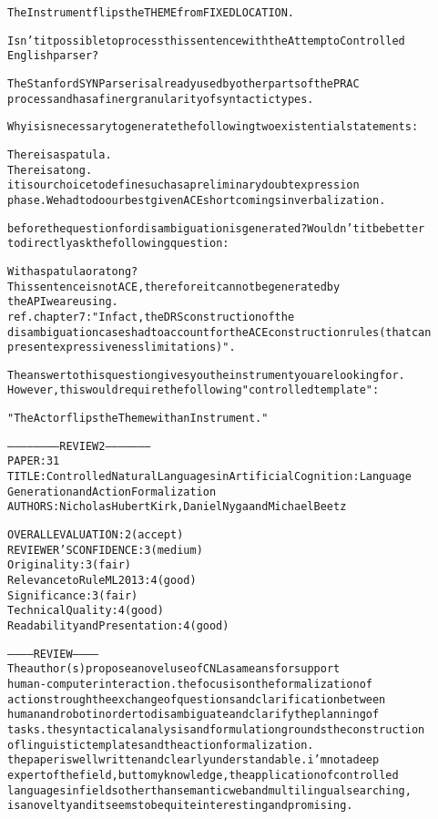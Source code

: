 \documentclass[oribibl]{llncs}
\newcommand{\comment}[1]{{\color{red} #1}}
\begin{document}
\begin{alltt}
   The Instrument flips the THEME from FIXEDLOCATION.

Isn't it possible to process this sentence with the Attempto Controlled 
English parser?

\comment{The Stanford SYN Parser is already used by other parts of the PRAC
 process and has a finer granularity of syntactic types.}

Why is is necessary to generate the following two existential statements:

   There is a spatula.
   There is a tong.
\comment{it is our choice to define such as a preliminary doubt expression
 phase. We had to do our best given ACE shortcomings in verbalization.}

before the question for disambiguation is generated? Wouldn't it be better
 to directly ask the following question:

   With a spatula or a tong?
\comment{This sentence is not ACE, therefore it cannot be generated by
 the API we are using.}
\comment{ref. chapter 7: "In fact, the DRS construction of the
disambiguation cases had to account for the ACE construction rules (that can
present expressiveness limitations)".}

The answer to this question gives you the instrument you are looking for. 
However, this would require the following "controlled template":

   "The Actor flips the Theme with an Instrument."


----------------------- REVIEW 2 ---------------------
PAPER: 31
TITLE: Controlled Natural Languages in Artificial Cognition: Language 
Generation and Action Formalization
AUTHORS: Nicholas Hubert Kirk, Daniel Nyga and Michael Beetz

OVERALL EVALUATION: 2 (accept)
REVIEWER'S CONFIDENCE: 3 (medium)
Originality: 3 (fair)
Relevance to RuleML 2013: 4 (good)
Significance: 3 (fair)
Technical Quality: 4 (good)
Readability and Presentation: 4 (good)

----------- REVIEW -----------
The author(s) propose a novel use of CNL as a means for support 
human-computer interaction. the focus is on the formalization of 
actions trough the exchange of questions and clarification between 
human and robot in order to disambiguate and clarify the planning of 
tasks. the syntactical analysis and formulation grounds the construction
 of linguistic templates and the action formalization.
the paper is well written and clearly understandable. i'm not a deep 
expert of the field, but to my knowledge, the  application  of controlled 
languages in fields other than semantic web and multilingual searching, 
is a novelty and it seems to be quite interesting and promising.



\end{alltt}
\end{document}
